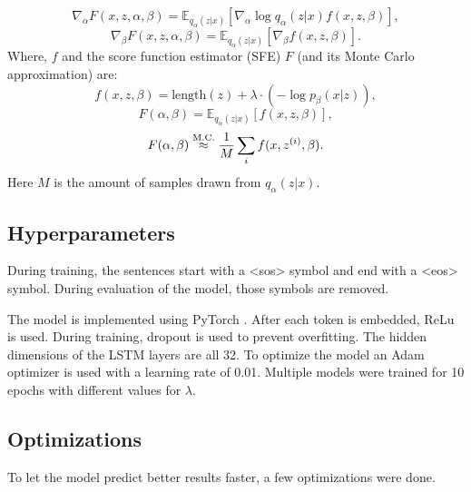 \begin{equation}
    \label{eq:gradient_alpha}
    \nabla_\alpha F(x, z, \alpha, \beta) = \mathbb{E}_{q_{\alpha}(z|x)} [\nabla_{\alpha} \log q_{\alpha}(z|x) f(x, z, \beta)],
\end{equation}
\begin{equation}
    \label{eq:gradient_beta}
    \nabla_\beta F(x, z, \alpha, \beta) = \mathbb{E}_{q_{\alpha}(z|x)} [\nabla_{\beta} f (x, z, \beta)].
\end{equation}
Where, $f$ and the score function estimator (SFE) $F$ (and its Monte Carlo approximation) are:
\begin{equation}
    \label{eq:f}
    f(x, z, \beta) = \text{length}(z) + \lambda \cdot (-\log p_{\beta}(x|z)),
\end{equation}
\begin{equation}
    \label{eq:F}
    F (\alpha, \beta) = \mathbb{E}_{q_{\alpha}(z|x)} [f(x, z, \beta)],
\end{equation}
\begin{equation}
    \label{eq:F_approx}
    F (\alpha, \beta) \stackrel{\text{M.C.}}{\approx} \frac{1}{M} \sum_i f (x, z^{(i)}, \beta).
\end{equation}
Here $M$ is the amount of samples drawn from $q_{\alpha}(z|x)$.

\subsection{Hyperparameters}
\label{sec:hyper}
During training, the sentences start with a <sos> symbol and end with a <eos> symbol.
During evaluation of the model, those symbols are removed.

The model is implemented using PyTorch \cite{pytorch}.
After each token is embedded, ReLu is used. During training, dropout is used to prevent overfitting. 
The hidden dimensions of the LSTM layers are all 32. 
To optimize the model an Adam optimizer \cite{adam} is used with a learning rate of 0.01. 
Multiple models were trained for 10 epochs with different values for $\lambda$.

\subsection{Optimizations}
\label{sec:optimizations}
To let the model predict better results faster, a few optimizations were done.

